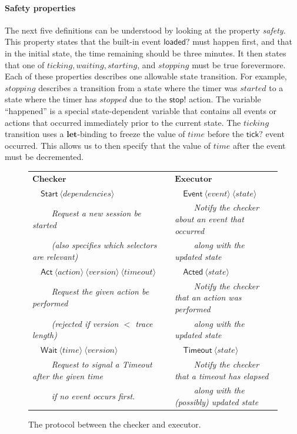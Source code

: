 \documentclass[sigplan,nonacm,10pt]{acmart}
\begin{document}
 \paragraph{Safety properties} The next five definitions can be understood by looking at the property \emph{safety}.
This property states that the built-in event $\mathsf{loaded?}$ must happen first, and that in the initial state,
 the time remaining should be three minutes. It then states that one of $\mathit{ticking}, \mathit{waiting}, \mathit{starting}$, and $\mathit{stopping}$ must
 be true forevermore. Each of these properties describes one allowable state transition. For example, $\mathit{stopping}$ describes a transition from a state where the timer
 was $\mathit{started}$ to a state where the timer has $\mathit{stopped}$ due to the $\mathsf{stop!}$ action. The variable ``happened'' is a special state-dependent variable that contains
 all events or actions that occurred immediately prior to the current state. The $\mathit{ticking}$ transition uses a $\textbf{let}$-binding to
 freeze the value of $\mathit{time}$ before the $\mathsf{tick?}$ event occurred. This allows us to then specify that the value of $\mathit{time}$ after the event must be decremented.
 \begin{figure}
  \begin{tabular}{ll}
  $\textbf{Checker}$&$\textbf{Executor}$\\
  $\quad\mathsf{Start}\ \langle\mathit{dependencies}\rangle$ & $\quad\mathsf{Event}\ \langle\mathit{event}\rangle\ \langle\mathit{state}\rangle$ \\
  $\qquad$ \emph{Request a new session be started} & $\qquad$ \emph{Notify the checker about an event that occurred}\\
  $\qquad$ \emph{(also specifies which selectors are relevant)} & $\qquad$ \emph{along with the updated state}\\[0.5em]
  $\quad\mathsf{Act}\ \langle\mathit{action}\rangle\ \langle\mathit{version}\rangle\ \langle\mathit{timeout}\rangle$ & $\quad\mathsf{Acted}\ \langle\mathit{state}\rangle$\\
  $\qquad$ \emph{Request the given action be performed} & $\qquad$ \emph{Notify the checker that an action was performed} \\
  $\qquad$ \emph{(rejected if version $<$ trace length)} & $\qquad$ \emph{along with the updated state}\\[0.5em]
  $\quad\mathsf{Wait}\ \langle\mathit{time}\rangle\ \langle\mathit{version}\rangle$ & $\quad\mathsf{Timeout}\ \langle\mathit{state}\rangle$ \\
  $\qquad$ \emph{Request to signal a \textsf{Timeout} after the given time} & $\qquad$ \emph{Notify the checker that a timeout has elapsed} \\
  $\qquad$ \emph{if no event occurs first.} & $\qquad$ \emph{along with the (possibly) updated state}
  \end{tabular}
  \caption{The protocol between the checker and executor.}
\label{fig:comms2}
\end{figure}
\end{document}
